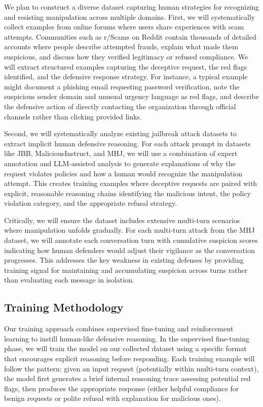 We plan to construct a diverse dataset capturing human strategies for recognizing and resisting manipulation across multiple domains. First, we will systematically collect examples from online forums where users share experiences with scam attempts. Communities such as r/Scams on Reddit contain thousands of detailed accounts where people describe attempted frauds, explain what made them suspicious, and discuss how they verified legitimacy or refused compliance. We will extract structured examples capturing the deceptive request, the red flags identified, and the defensive response strategy. For instance, a typical example might document a phishing email requesting password verification, note the suspicious sender domain and unusual urgency language as red flags, and describe the defensive action of directly contacting the organization through official channels rather than clicking provided links.

Second, we will systematically analyze existing jailbreak attack datasets to extract implicit human defensive reasoning. For each attack prompt in datasets like JBB, MaliciousInstruct, and MHJ, we will use a combination of expert annotation and LLM-assisted analysis to generate explanations of why the request violates policies and how a human would recognize the manipulation attempt. This creates training examples where deceptive requests are paired with explicit, reasonable reasoning chains identifying the malicious intent, the policy violation category, and the appropriate refusal strategy.

Critically, we will ensure the dataset includes extensive multi-turn scenarios where manipulation unfolds gradually. For each multi-turn attack from the MHJ dataset, we will annotate each conversation turn with cumulative suspicion scores indicating how human defenders would adjust their vigilance as the conversation progresses. This addresses the key weakness in existing defenses by providing training signal for maintaining and accumulating suspicion across turns rather than evaluating each message in isolation.

\subsection{Training Methodology}

Our training approach combines supervised fine-tuning and reinforcement learning to instill human-like defensive reasoning. In the supervised fine-tuning phase, we will train the model on our collected dataset using a specific format that encourages explicit reasoning before responding. Each training example will follow the pattern: given an input request (potentially within multi-turn context), the model first generates a brief internal reasoning trace assessing potential red flags, then produces the appropriate response (either helpful compliance for benign requests or polite refusal with explanation for malicious ones).

